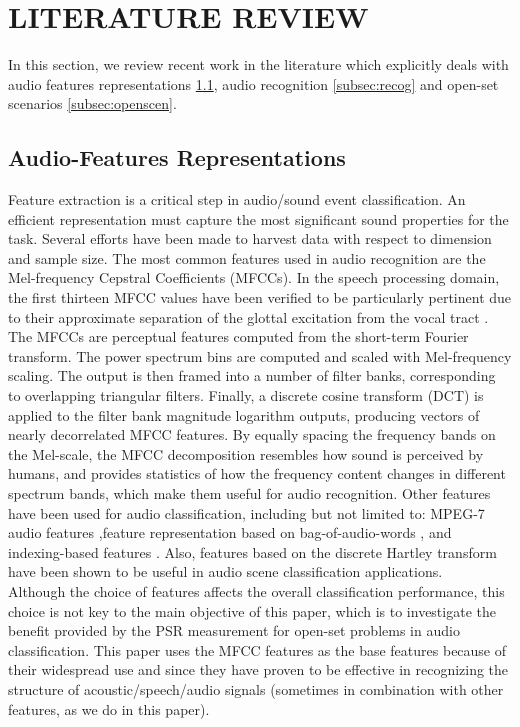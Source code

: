 \documentclass{ieeeaccess}
\begin{document}
\section{LITERATURE REVIEW} \label{sec:II}
In this section, we review recent work in the literature which explicitly deals with audio features representations \ref{subsec:features}, audio recognition \ref{subsec:recog} and open-set scenarios \ref{subsec:openscen}. 

\subsection{Audio-Features Representations} \label{subsec:features}
Feature extraction is a critical step in audio/sound event classification. An efficient representation must capture the most significant sound properties for the task. Several efforts have been made to harvest data with respect to dimension and sample size. The most common features used in audio recognition are the Mel-frequency Cepstral Coefficients (MFCCs). In the speech processing domain, the first thirteen MFCC values have been verified to be particularly pertinent due to their approximate separation of the glottal excitation from the vocal tract \cite{6}. The MFCCs are perceptual features computed from the short-term Fourier transform. The power spectrum bins are computed and scaled with Mel-frequency scaling. The output is then framed into a number of filter banks, corresponding to overlapping triangular filters. Finally, a discrete cosine transform (DCT) is applied to the filter bank magnitude logarithm outputs, producing vectors of nearly decorrelated MFCC features. By equally spacing the frequency bands on the Mel-scale, the MFCC decomposition resembles how sound is perceived by humans, and provides statistics of how the frequency content changes in different spectrum bands, which make them useful for audio recognition. Other features have been used for audio classification, including but not limited to: MPEG-7 audio features \cite{7},feature representation based on bag-of-audio-words \cite{8}, and indexing-based features \cite{9}. Also, features based on the discrete Hartley transform \cite{10} have been shown to be useful in audio scene classification applications. \\
Although the choice of features affects the overall classification performance, this choice is not key to the main objective of this paper, which is to investigate the benefit provided by the PSR measurement for open-set problems in audio classification. This paper uses the MFCC features as the base features because of their widespread use and since they have proven to be effective in recognizing the structure of acoustic/speech/audio signals (sometimes in combination with other features, as we do in this paper). 
\end{document}
